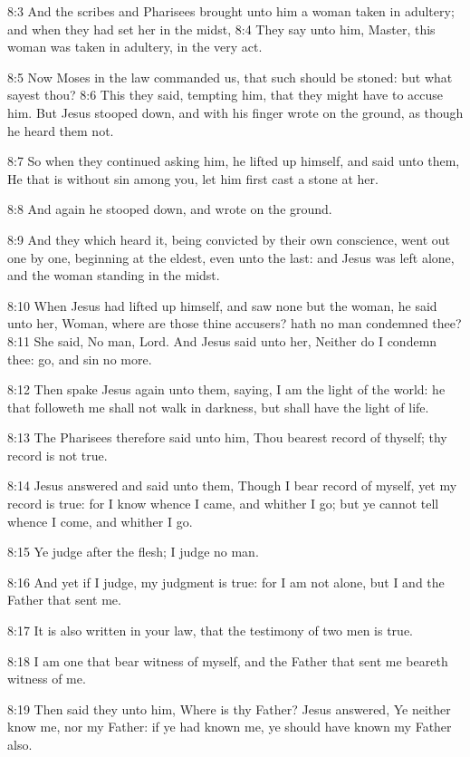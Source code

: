 8:3 And the scribes and Pharisees brought unto him a woman taken in
adultery; and when they had set her in the midst, 8:4 They say unto
him, Master, this woman was taken in adultery, in the very act.

8:5 Now Moses in the law commanded us, that such should be stoned: but
what sayest thou?  8:6 This they said, tempting him, that they might
have to accuse him. But Jesus stooped down, and with his finger wrote
on the ground, as though he heard them not.

8:7 So when they continued asking him, he lifted up himself, and said
unto them, He that is without sin among you, let him first cast a
stone at her.

8:8 And again he stooped down, and wrote on the ground.

8:9 And they which heard it, being convicted by their own conscience,
went out one by one, beginning at the eldest, even unto the last: and
Jesus was left alone, and the woman standing in the midst.

8:10 When Jesus had lifted up himself, and saw none but the woman, he
said unto her, Woman, where are those thine accusers? hath no man
condemned thee?  8:11 She said, No man, Lord. And Jesus said unto her,
Neither do I condemn thee: go, and sin no more.

8:12 Then spake Jesus again unto them, saying, I am the light of the
world: he that followeth me shall not walk in darkness, but shall have
the light of life.

8:13 The Pharisees therefore said unto him, Thou bearest record of
thyself; thy record is not true.

8:14 Jesus answered and said unto them, Though I bear record of
myself, yet my record is true: for I know whence I came, and whither I
go; but ye cannot tell whence I come, and whither I go.

8:15 Ye judge after the flesh; I judge no man.

8:16 And yet if I judge, my judgment is true: for I am not alone, but
I and the Father that sent me.

8:17 It is also written in your law, that the testimony of two men is
true.

8:18 I am one that bear witness of myself, and the Father that sent me
beareth witness of me.

8:19 Then said they unto him, Where is thy Father? Jesus answered, Ye
neither know me, nor my Father: if ye had known me, ye should have
known my Father also.

